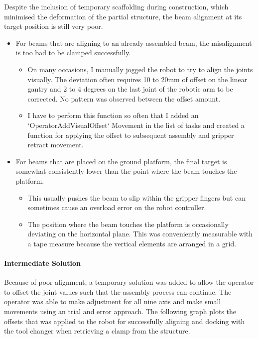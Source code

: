{Despite the inclusion of temporary scaffolding during construction, which minimised the deformation of the partial structure, the beam alignment at its target position is still very poor.

\begin{itemize}
	\item For beams that are aligning to an already-assembled beam, the misalignment is too bad to be clamped successfully. 

\begin{itemize}
	\item On many occasions, I manually jogged the robot to try to align the joints visually. The deviation often requires 10 to 20mm of offset on the linear gantry and 2 to 4 degrees on the last joint of the robotic arm to be corrected. No pattern was observed between the offset amount.

	\item I have to perform this function so often that I added an `OperatorAddVisualOffset` Movement in the list of tasks and created a function for applying the offset to subsequent assembly and gripper retract movement. 

\end{itemize}
	\item For beams that are placed on the ground platform, the final target is somewhat consistently lower than the point where the beam touches the platform. 

\begin{itemize}
	\item This usually pushes the beam to slip within the gripper fingers but can sometimes cause an overload error on the robot controller.

	\item The position where the beam touches the platform is occasionally deviating on the horizontal plane. This was conveniently measurable with a tape measure because the vertical elements are arranged in a grid.

\end{itemize}
\end{itemize}

\paragraph{Intermediate Solution}

Because of poor alignment, a temporary solution was added to allow the operator to offset the joint values such that the assembly process can continue. The operator was able to make adjustment for all nine axis and make small movements using an trial and error approach. The following graph plots the offsets that was applied to the robot for successfully aligning and docking with the tool changer when retrieving a clamp from the structure.

}
